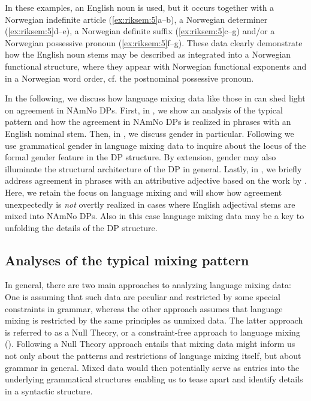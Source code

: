 \documentclass[output=paper]{langscibook}
\begin{document}
In these examples, an English noun is used, but it occurs together with a Norwegian indefinite article (\ref{ex:riksem:5}a–b), a Norwegian determiner (\ref{ex:riksem:5}d–e), a Norwegian definite suffix (\ref{ex:riksem:5}c–g) and/or a Norwegian possessive pronoun (\ref{ex:riksem:5}f–g). These data clearly demonstrate how the English noun stems may be described as integrated into a Norwegian functional structure, where they appear with Norwegian functional exponents and in a Norwegian word order, cf. the postnominal possessive pronoun. 



In the following, we discuss how language mixing data like those in  can shed light on agreement in NAmNo DPs. First, in , we show an analysis of the typical pattern and how the agreement in NAmNo DPs is realized in phrases with an English nominal stem. Then, in , we discuss gender in particular. Following \citet{ÅfarliEtAl2021} we use grammatical gender in language mixing data to inquire about the locus of the formal gender feature in the DP structure. By extension, gender may also illuminate the structural architecture of the DP in general. Lastly, in , we briefly address agreement in phrases with an attributive adjective based on the work by \citet{RiksemEtAl2021}. Here, we retain the focus on language mixing and will show how agreement unexpectedly is \textit{not} overtly realized in cases where English adjectival stems are mixed into NAmNo DPs. Also in this case language mixing data may be a key to unfolding the details of the DP structure. 


\subsection{Analyses of the typical mixing pattern}\label{sec:riksem:4.1}
\largerpage

In general, there are two main approaches to analyzing language mixing data: One is assuming that such data are peculiar and restricted by some special constraints in grammar, whereas the other approach assumes that language mixing is restricted by the same principles as unmixed data. The latter approach is referred to as a Null Theory, or a constraint-free approach to language mixing (\citealt{Mahootian1993, MacSwan1999}). Following a Null Theory approach entails that mixing data might inform us not only about the patterns and restrictions of language mixing itself, but about grammar in general. Mixed data would then potentially serve as entries into the underlying grammatical structures enabling us to tease apart and identify details in a syntactic structure. 
\end{document}
